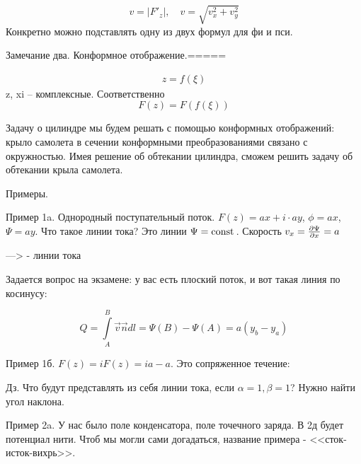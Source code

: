 \begin{equation}
	v=|F'_z|, \quad
	v=\sqrt{v_x^2+v_y^2}
\end{equation}
Конкретно можно подставлять одну из двух формул для фи и пси.

Замечание два. Конформное отображение.=====

\begin{gather}
	\label{eqdd}
	z=f(\xi)
\end{gather}
z, xi -- комплексные. Соответственно
\begin{equation}
	F(z)=F(f(\xi))
\end{equation}

Задачу о цилиндре мы будем решать с помощью конформных отображений: крыло самолета в сечении конформными преобразованиями связано с окружностью. Имея решение об обтекании цилиндра, сможем решить задачу об обтекании крыла самолета.

Примеры.

Пример 1a. Однородный поступательный поток. $F(z)=ax+i\cdot ay$, $\phi=ax$, $\Psi=ay$. Что такое линии тока? Это линии $\Psi=\mathrm{const}\,$. Скорость $v_x=\pdv{\Psi}{x}=a$

---> - линии тока

Задается вопрос на экзамене: у вас есть плоский поток, и вот такая линия по косинусу:

\begin{equation}
	Q=\int\limits_{A}^{B} \vec{v}\vec{n}dl=\Psi(B)-\Psi(A)=a(y_b-y_a)
\end{equation}


Пример 1б. $F(z)=iF(z)=ia-a$. Это сопряженное течение:


Дз. Что будут представлять из себя линии тока, если $\alpha=1,\beta=1$? Нужно найти угол наклона.

Пример 2a. У нас было поле конденсатора, поле точечного заряда. В 2д будет потенциал нити. Чтоб мы могли сами догадаться, название примера - <<сток-исток-вихрь>>.

